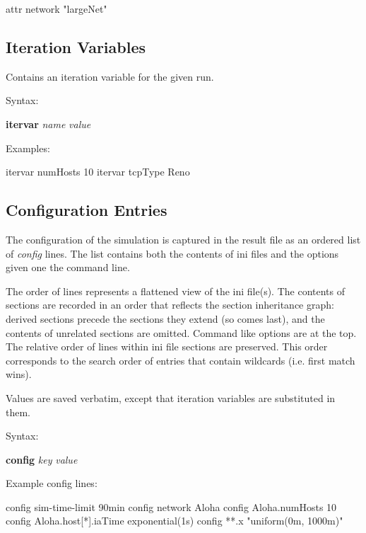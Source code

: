 \begin{filelisting}
attr network "largeNet"
\end{filelisting}


\subsection{Iteration Variables}
\label{sec:result-file-formats:opp:itervar}

Contains an iteration variable for the given run.

Syntax:

\hspace{20mm} \textbf{itervar} \textit{name} \textit{value}

Examples:

\begin{filelisting}
itervar numHosts 10
itervar tcpType Reno
\end{filelisting}


\subsection{Configuration Entries}
\label{sec:result-file-formats:opp:config}

The configuration of the simulation is captured in the result file as an ordered
list of \textit{config} lines. The list contains both the contents of ini files
and the options given one the command line.

The order of lines represents a flattened view of the ini file(s). The contents
of sections are recorded in an order that reflects the section inheritance
graph: derived sections precede the sections they extend (so  comes
last), and the contents of unrelated sections are omitted. Command like options
are at the top. The relative order of lines within ini file sections are
preserved. This order corresponds to the search order of entries that contain
wildcards (i.e. first match wins).

Values are saved verbatim, except that iteration variables are substituted in
them.

Syntax:

\hspace{20mm} \textbf{config} \textit{key} \textit{value}

Example config lines:

\begin{filelisting}
config sim-time-limit 90min
config network Aloha
config Aloha.numHosts 10
config Aloha.host[*].iaTime exponential(1s)
config **.x "uniform(0m, 1000m)"
\end{filelisting}


